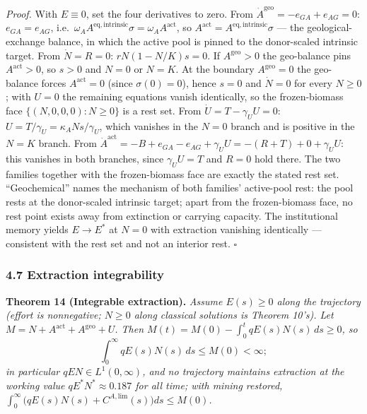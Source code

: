 \documentclass[11pt]{article}
\begin{document}
\emph{Proof.} With \(E \equiv 0\), set the four derivatives to zero.
From \(\dot A^{\mathrm{geo}} = -e_{GA} + e_{AG} = 0\):
\(e_{GA} = e_{AG}\),
i.e.~\(\omega_A A^{\mathrm{eq,intrinsic}} \sigma = \omega_A A^{\mathrm{act}}\),
so \(A^{\mathrm{act}} = A^{\mathrm{eq,intrinsic}} \sigma\) --- the
geological-exchange balance, in which the active pool is pinned to the
donor-scaled intrinsic target. From \(\dot N = R = 0\):
\(rN(1 - N/\allowbreak{}K)s = 0\). If \(A^{\mathrm{geo}} > 0\) the geo-balance pins
\(A^{\mathrm{act}} > 0\), so \(s > 0\) and \(N = 0\) or \(N = K\). At
the boundary \(A^{\mathrm{geo}} = 0\) the geo-balance forces
\(A^{\mathrm{act}} = 0\) (since \(\sigma(0) = 0\)), hence \(s = 0\) and
\(\dot N = 0\) for every \(N \ge 0\); with \(U = 0\) the remaining
equations vanish identically, so the frozen-biomass face
\(\{(N, 0, 0, 0) : N \ge 0\}\) is a rest set. From
\(\dot U = T - \gamma_U U = 0\):
\(U = T/\gamma_U = \kappa_A N s/\gamma_U\), which vanishes in the
\(N = 0\) branch and is positive in the \(N = K\) branch. From
\(\dot A^{\mathrm{act}} = -B + e_{GA} - e_{AG} + \gamma_U U = -(R + T) + 0 + \gamma_U U\):
this vanishes in both branches, since \(\gamma_U U = T\) and \(R = 0\)
hold there. The two families together with the frozen-biomass face are
exactly the stated rest set. ``Geochemical'' names the mechanism of both
families' active-pool rest: the pool rests at the donor-scaled intrinsic
target; apart from the frozen-biomass face, no rest point exists away
from extinction or carrying capacity. The institutional memory yields
\(E \to E^*\) at \(N = 0\) with extraction vanishing identically ---
consistent with the rest set and not an interior rest. \ensuremath{\square}

\subsubsection{4.7 Extraction
integrability}\label{extraction-integrability}

\textbf{Theorem 14 (Integrable extraction).} \emph{Assume \(E(s) \ge 0\)
along the trajectory (effort is nonnegative; \(N \ge 0\) along classical
solutions is Theorem 10's). Let
\(M = N + A^{\mathrm{act}} + A^{\mathrm{geo}} + U\). Then
\(M(t) = M(0) - \int_0^t qE(s)N(s)\, ds \ge 0\), so}
\[\int_0^\infty qE(s)N(s)\, ds \le M(0) < \infty;\] \emph{in particular
\(qEN \in L^1(0,\infty)\), and no trajectory maintains extraction at the
working value \(qE^*N^* \approx 0.187\) for all time; with mining
restored,
\(\int_0^\infty \bigl( qE(s)N(s) + C^{A,\mathrm{lim}}(s) \bigr) ds \le M(0)\).}
\end{document}
